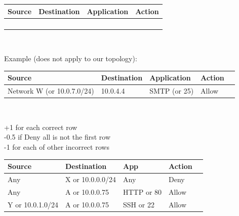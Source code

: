 \begin{parts}
{
\centering
\begin{tabular}{|p{4cm}|p{4cm}|p{3cm}|p{3cm}|}
\hline
\textbf{Source} & \textbf{Destination}  & \textbf{Application}  & \textbf{Action} \\      \hline
                &                       &                       &                 \\[2ex] \hline
                &                       &                       &                 \\[2ex] \hline
                &                       &                       &                 \\[2ex] \hline
                &                       &                       &                 \\[2ex] \hline
\end{tabular}\\

}
\vspace{.1in}

Example (does not apply to our topology):\\

{
\centering
\begin{tabular}{|p{4cm}|p{4cm}|l|p{2cm}|p{1cm}|}
\hline
\textbf{Source}             & \textbf{Destination}  & \textbf{Application}  & \textbf{Action} \\ \hline
Network W (or 10.0.7.0/24)  & 10.0.4.4              & SMTP (or 25)          & Allow           \\ \hline
\end{tabular}\\
}

\vspace{.1in}

\begin{solution}[3in]

+1 for each correct row\\
-0.5 if Deny all is not the first row\\
-1 for each of other incorrect rows\\

{
\centering
\begin{tabular}{|l|l|l|l|l|}
\hline
\textbf{Source}   & \textbf{Destination}  & \textbf{App}    & \textbf{Action} \\ \hline
Any               & X or 10.0.0.0/24      & Any             & Deny            \\ \hline
Any               & A or 10.0.0.75        & HTTP or 80      & Allow           \\ \hline
Y or 10.0.1.0/24  & A or 10.0.0.75        & SSH or 22       & Allow           \\ \hline
\end{tabular}\\
}

\end{solution}

\end{parts}
